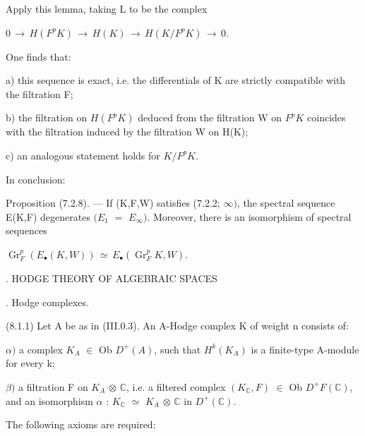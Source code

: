 \documentclass[11pt,twoside]{article}
\newcommand{\DFormula}[1]{%
  \par\smallskip\noindent\hspace*{0pt}\(\displaystyle #1\)\par\smallskip
}
\begin{document}
Apply this lemma, taking L to be the complex\par
\par\medskip
\DFormula{0\,\to \,H(F^{p}K)\,\to \,H(K)\,\to \,H(K/F^{p}K)\,\to \,0.}
\par\medskip
One finds that:\par
\par\medskip
a) this sequence is exact, i.e. the differentials of K are strictly compatible with the filtration F;\par
\par\medskip
b) the filtration on \(H(F^{p}K)\) deduced from the filtration W on \(F^{p}K\) coincides with the filtration induced by the filtration W on H(K);\par
\par\medskip
c) an analogous statement holds for \(K/F^{p}K\).\par
\par\medskip
In conclusion:\par
\par\medskip
Proposition (7.2.8). — If (K,F,W) satisfies (7.2.2; \(\infty )\), the spectral sequence E(K,F) degenerates \((E_{1}\) \(=\) \(E_{\infty })\). Moreover, there is an isomorphism of spectral sequences\par
\par\medskip
\DFormula{\operatorname{Gr}_{F}^{p}(E_{\bullet }(K,W))\,\simeq \,E_{\bullet }(\operatorname{Gr}_{F}^{p}K,W).}
\par{}. HODGE THEORY OF ALGEBRAIC SPACES\par
\par{}. Hodge complexes.\par
\par\medskip
(8.1.1) Let A be as in (III.0.3). An A-Hodge complex K of weight n consists of:\par
\par\medskip
\(\alpha )\) a complex \(K_{A}\) \(\in \) Ob \(D^{+}(A)\), such that \(H^{k}(K_{A})\) is a finite-type A-module for every k;\par
\par\medskip
\(\beta )\) a filtration F on \(K_{A}\) \(\otimes \) \(\mathbb{C}\), i.e. a filtered complex \((K_{\mathbb{C}},F)\) \(\in \) Ob \(D^{+}F(\mathbb{C})\), and an isomorphism \(\alpha \) : \(K_{\mathbb{C}}\) \(\simeq \) \(K_{A}\) \(\otimes \) \(\mathbb{C}\) in \(D^{+}(\mathbb{C})\).\par
\par\medskip
The following axioms are required:\par
\end{document}

